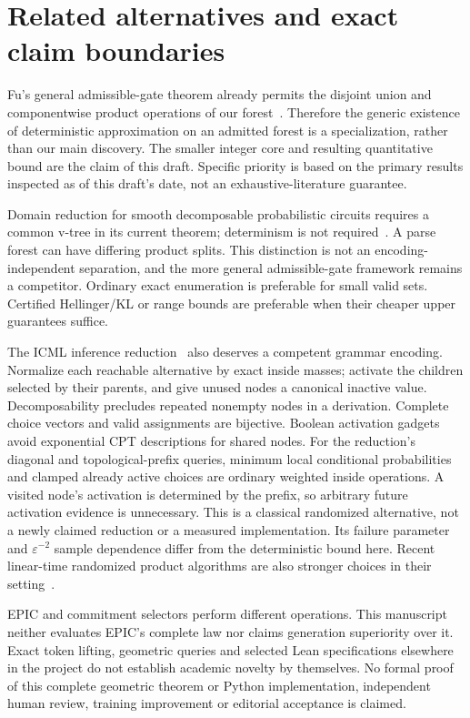 \documentclass[11pt]{article}
\begin{document}
\section{Related alternatives and exact claim boundaries}\label{sec:related}
Fu's general admissible-gate theorem already permits the disjoint union and
componentwise product operations of our forest~\cite{fu}. Therefore the
generic existence of deterministic approximation on an admitted forest is
a specialization, rather than our main discovery. The smaller integer core
and resulting quantitative bound are the claim of this draft. Specific
priority is based on the primary results inspected as of this draft's date,
not an exhaustive-literature guarantee.

Domain reduction for smooth decomposable probabilistic circuits requires a
common v-tree in its current theorem; determinism is not required~\cite{domain}.
A parse forest can have differing product splits. This distinction is not
an encoding-independent separation, and the more general admissible-gate
framework remains a competitor. Ordinary exact enumeration is preferable
for small valid sets. Certified Hellinger/KL or range bounds are preferable
when their cheaper upper guarantees suffice.

The ICML inference reduction~\cite{inference} also deserves a competent grammar
encoding. Normalize each reachable alternative by exact inside masses; activate
the children selected by their parents, and give unused nodes a canonical
inactive value. Decomposability precludes repeated nonempty nodes in a
derivation. Complete choice vectors and valid assignments are bijective.
Boolean activation gadgets avoid exponential CPT descriptions for shared nodes.
For the reduction's diagonal and topological-prefix queries, minimum local
conditional probabilities and clamped already active choices are ordinary
weighted inside operations. A visited node's activation is determined by
the prefix, so arbitrary future activation evidence is unnecessary.
This is a classical randomized alternative, not a newly claimed reduction
or a measured implementation. Its failure parameter and $\varepsilon^{-2}$
sample dependence differ from the deterministic bound here. Recent linear-time
randomized product algorithms are also stronger choices in their setting~\cite{linear}.

EPIC and commitment selectors perform different operations. This manuscript
neither evaluates EPIC's complete law nor claims generation superiority over
it. Exact token lifting, geometric queries and selected Lean specifications
elsewhere in the project do not establish academic novelty by themselves.
No formal proof of this complete geometric theorem or Python implementation,
independent human review, training improvement or editorial acceptance is
claimed.
\end{document}
